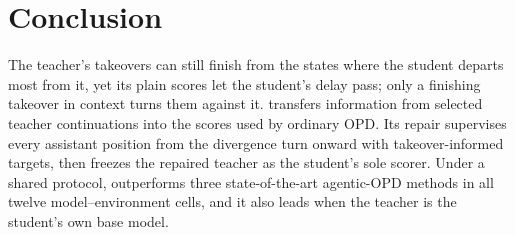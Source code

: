 \section{Conclusion}
\label{sec:conclusion}

The teacher's takeovers can still finish from the states where the student departs most from it,
yet its plain scores let the student's delay pass; only a finishing takeover in context turns them against it.
\method{} transfers information from selected teacher continuations into the
scores used by ordinary OPD. Its repair supervises every assistant
position from the divergence turn onward with takeover-informed targets,
then freezes the repaired teacher as the student's sole scorer. Under a shared protocol,
\method{} outperforms three state-of-the-art agentic-OPD methods in all twelve model--environment cells,
and it also leads when the teacher is the student's own base model.
